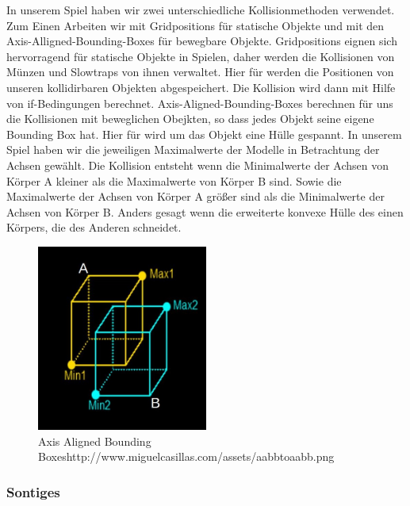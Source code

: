 \documentclass[12pt]{article}
\begin{document}
In unserem Spiel haben wir zwei unterschiedliche Kollisionmethoden verwendet.
Zum Einen Arbeiten wir mit Gridpositions für statische Objekte und mit den
Axis-Alligned-Bounding-Boxes für bewegbare Objekte.\newline
\newline
Gridpositions eignen sich hervorragend für statische Objekte in Spielen, daher werden die Kollisionen
von Münzen und Slowtraps von ihnen verwaltet. Hier für werden die Positionen von unseren kollidirbaren
Objekten abgespeichert. Die Kollision wird dann mit Hilfe von if-Bedingungen berechnet.\newline
\newline
Axis-Aligned-Bounding-Boxes berechnen für uns die Kollisionen mit beweglichen Obejkten, so dass jedes Objekt seine eigene
Bounding Box hat. Hier für wird um das Objekt eine Hülle gespannt. In unserem Spiel haben wir die jeweiligen Maximalwerte
der Modelle in Betrachtung der Achsen gewählt. Die Kollision entsteht wenn die Minimalwerte der Achsen von Körper A kleiner
als die Maximalwerte von Körper B sind. Sowie die Maximalwerte der Achsen von Körper A größer sind als die Minimalwerte der
Achsen von Körper B. Anders gesagt wenn die erweiterte konvexe Hülle des einen Körpers, die des Anderen schneidet.

\begin{figure}
	\centering
	\includegraphics[width=0.5\textwidth]{AABB}
	\caption{Axis Aligned Bounding Boxes\newline \tiny http://www.miguelcasillas.com/assets/aabbtoaabb.png 
		\label{fig:AABB}}
\end{figure}

\vspace{1cm}
\subsubsection{Sontiges}
\end{document}
